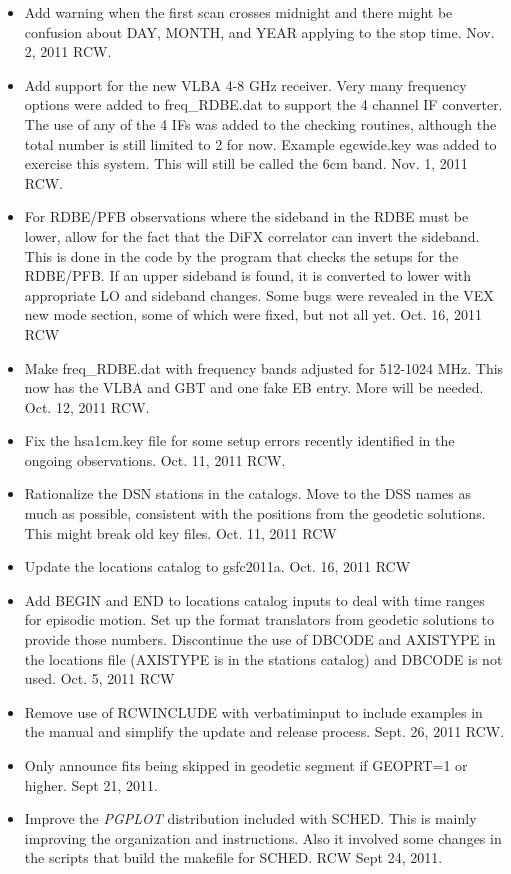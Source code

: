\documentclass{report}
\newcommand{\sched}{{\sc SCHED}}
\begin{document}
\begin{itemize}
\item Add warning when the first scan crosses midnight and there might
be confusion about DAY, MONTH, and YEAR applying to the stop time.
Nov. 2, 2011  RCW.

\item Add support for the new VLBA 4-8 GHz receiver.  Very many
frequency options were added to freq\_RDBE.dat to support the 4 channel
IF converter.  The use of any of the 4 IFs was added to the checking
routines, although the total number is still limited to 2 for now.
Example egcwide.key was added to exercise this system.  This will still
be called the 6cm band.  Nov. 1, 2011 RCW.

\item For RDBE/PFB observations where the sideband in the RDBE
must be lower, allow for the fact that the DiFX correlator can invert
the sideband.  This is done in the code by the program that checks
the setups for the RDBE/PFB.  If an upper sideband is found, it is
converted to lower with appropriate LO and sideband changes.
Some bugs were revealed in the VEX new mode section,
some of which were fixed, but not all yet.  Oct. 16, 2011  RCW

\item Make freq\_RDBE.dat with frequency bands adjusted for 512-1024 MHz.
This now has the VLBA and GBT and one fake EB entry.  More will be 
needed.  Oct. 12, 2011  RCW.

\item Fix the hsa1cm.key file for some setup errors recently identified
in the ongoing observations.  Oct. 11, 2011  RCW.

\item Rationalize the DSN stations in the catalogs.  Move to the DSS
names as much as possible, consistent with the positions from the 
geodetic solutions.  This might break old key files. Oct. 11, 2011  RCW

\item Update the locations catalog to gsfc2011a.  Oct. 16, 2011  RCW

\item Add BEGIN and END to locations catalog inputs to deal with time
ranges for episodic motion.  Set up the format translators from 
geodetic solutions to provide those numbers.  Discontinue the use
of DBCODE and AXISTYPE in the locations file (AXISTYPE is in the
stations catalog) and DBCODE is not used.  Oct. 5, 2011 RCW

\item Remove use of RCWINCLUDE with verbatiminput to include examples
in the manual and simplify the update and release process.  Sept. 26, 2011
RCW.

\item Only announce fits being skipped in geodetic segment if GEOPRT=1 or
higher.  Sept 21, 2011.

\item Improve the {\sl PGPLOT} distribution included with \sched.  This is
mainly improving the organization and instructions.  Also it involved 
some changes in the scripts that build the makefile for \sched.
RCW  Sept 24, 2011.

\end {itemize}
\end{document}
